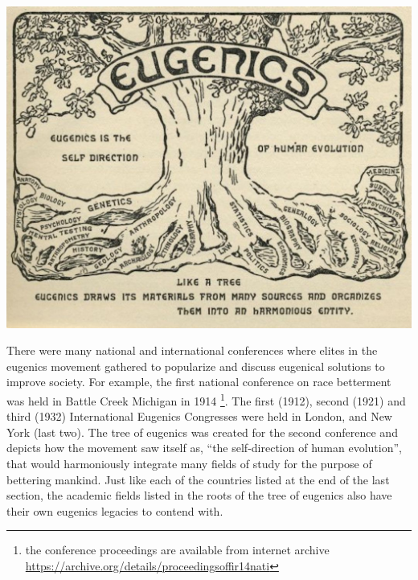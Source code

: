 \documentclass[
  oneside,
  12pt]{crumpbook}
\newenvironment{floatright50}{%
  \wrapfigure{R}{.5\textwidth}%
  }{%
  \endwrapfigure}
\begin{document}
\begin{floatright50}
\includegraphics[width=1\linewidth]{imgs/Eugenics_tree}

\end{floatright50}

There were many national and international conferences where elites in the eugenics movement gathered to popularize and discuss eugenical solutions to improve society. For example, the first national conference on race betterment was held in Battle Creek Michigan in 1914 \footnote{the conference proceedings are available from internet archive \url{https://archive.org/details/proceedingsoffir14nati}}. The first (1912), second (1921) and third (1932) International Eugenics Congresses were held in London, and New York (last two). The tree of eugenics was created for the second conference and depicts how the movement saw itself as, ``the self-direction of human evolution'', that would harmoniously integrate many fields of study for the purpose of bettering mankind. Just like each of the countries listed at the end of the last section, the academic fields listed in the roots of the tree of eugenics also have their own eugenics legacies to contend with.
\end{document}
